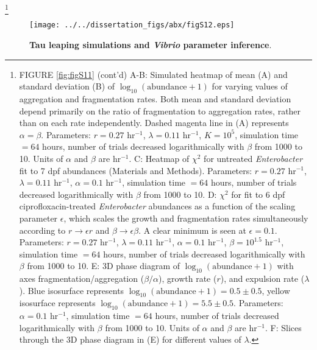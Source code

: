 {{{{{{{\let\thefootnote\relax\footnote{FIGURE \ref{fig:figS11} (cont'd) A-B: Simulated heatmap of mean (A) and standard deviation (B) of $\log_{10}(\text{abundance} + 1)$ for varying values of aggregation and fragmentation rates. Both mean and standard deviation depend primarily on the ratio of fragmentation to aggregation rates, rather than on each rate independently. Dashed magenta line in (A) represents $\alpha = \beta$. Parameters: $r = 0.27$ hr$^{-1}$, $\lambda = 0.11$ hr$^{-1}$, $K = 10^5$, simulation time $= 64$ hours, number of trials decreased logarithmically with $\beta$ from 1000 to 10. Units of $\alpha$ and $\beta$ are hr$^{-1}$.  C: Heatmap of $\chi^2$ for untreated \textit{Enterobacter} fit to 7 dpf abundances (Materials and Methods). Parameters: $r = 0.27$ hr$^{-1}$, $\lambda = 0.11$ hr$^{-1}$, $\alpha = 0.1$ hr$^{-1}$, simulation time $= 64$ hours, number of trials decreased logarithmically with $\beta$ from 1000 to 10. D:   $\chi^2$ for fit to 6 dpf ciprofloxacin-treated \textit{Enterobacter} abundances as a function of the scaling parameter $\epsilon$, which scales the growth and fragmentation rates simultaneously according to $r \to \epsilon r$ and $\beta \to \epsilon \beta$. A clear minimum is seen at $\epsilon = 0.1$. Parameters: $r = 0.27$ hr$^{-1}$, $\lambda = 0.11$ hr$^{-1}$, $\alpha = 0.1$ hr$^{-1}$, $\beta = 10^{1.5}$ hr$^{-1}$, simulation time $= 64$ hours, number of trials decreased logarithmically with $\beta$ from 1000 to 10. E: 3D phase diagram of $\log_{10}(\text{abundance} + 1)$ with axes fragmentation/aggregation ($\beta/\alpha$), growth rate ($r$), and expulsion rate ($\lambda$). Blue isosurface represents $\log_{10}(\text{abundance} + 1) = 0.5 \pm 0.5$, yellow isosurface represents  $\log_{10}(\text{abundance} + 1) = 5.5 \pm 0.5$. Parameters: $\alpha = 0.1$ hr$^{-1}$, simulation time $= 64$ hours, number of trials decreased logarithmically with $\beta$ from 1000 to 10. Units of $\alpha$ and $\beta$ are hr$^{-1}$. F: Slices through the 3D phase diagram in (E) for different values of $\lambda$.}


\begin{figure}[H]
	\centerline{
		\texttt{[image: ../../dissertation\_figs/abx/figS12.eps]}} 
	\caption{\textbf{Tau leaping simulations and \textit{Vibrio} parameter inference}.}
	\label{fig:figS12}
\end{figure}

}}}}}}}
